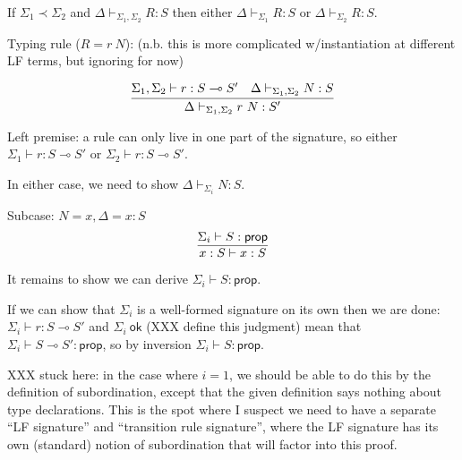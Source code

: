 \documentclass{article}
\newcommand{\lolli}{\multimap}
\newcommand{\prop}{\mathsf{prop}}
\newcommand{\ok}{\mathsf{ok}}
\newcommand{\subord}{\prec}
\begin{document}
If $\Sigma_1 \subord \Sigma_2$ and 
$\Delta \vdash_{\Sigma_1, \Sigma_2} R : S$
then either
$\Delta \vdash_{\Sigma_1} R : S$
or
$\Delta \vdash_{\Sigma_2} R : S$.

Typing rule ($R = r\ N$): (n.b. this is more complicated w/instantiation at
different LF terms, but ignoring for now)


\[
\infer
{ \Delta \vdash_{\Sigma_1, \Sigma_2} r\ N : S' }
{ \Sigma_1, \Sigma_2 \vdash r : S \lolli S' 
  &
  \Delta \vdash_{\Sigma_1,\Sigma_2} N : S
}
\]

Left premise: a rule can only live in one part of the signature, so either
$\Sigma_1 \vdash r : S \lolli S'$ or $\Sigma_2 \vdash r : S \lolli S'$.

In either case, we need to show $\Delta \vdash_{\Sigma_i} N : S$.

Subcase: $N = x, \Delta = x{:}S$
\[
\infer
{ x:{S} \vdash x : S }
{ \Sigma_i \vdash S : \prop }
\]

It remains to show we can derive $\Sigma_i \vdash S : \prop$. 

If we can show that $\Sigma_i$ is a well-formed signature on its own then
we are done: $\Sigma_i \vdash r : S \lolli S'$ and $\Sigma_i\ \ok$ (XXX
define this judgment) mean that $\Sigma_i \vdash S \lolli S' : \prop$, so
by inversion $\Sigma_i \vdash S : \prop$.

XXX stuck here: in the case where $i = 1$, we should be able to do this by
the definition of subordination, except that the given definition says
nothing about type declarations. This is the spot where I suspect we need
to have a separate ``LF signature'' and ``transition rule signature'',
where the LF signature has its own (standard) notion of subordination that
will factor into this proof.

% 
% 
\end{document}
